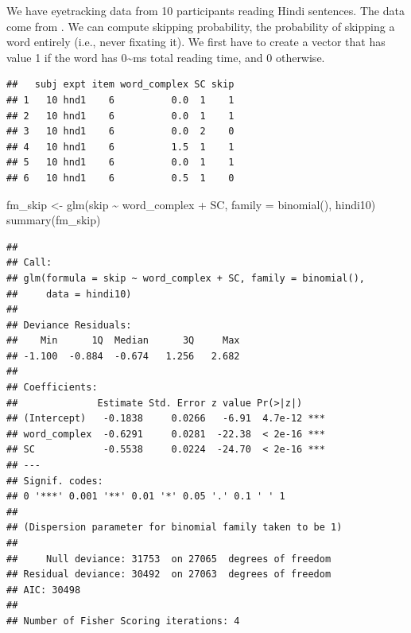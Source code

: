\documentclass[
  12pt,
]{krantz}
\newenvironment{Shaded}{\begin{snugshade}}{\end{snugshade}}
\newcommand{\AttributeTok}[1]{\textcolor[rgb]{0.77,0.63,0.00}{#1}}
\newcommand{\DecValTok}[1]{\textcolor[rgb]{0.00,0.00,0.81}{#1}}
\newcommand{\DocumentationTok}[1]{\textcolor[rgb]{0.56,0.35,0.01}{\textbf{\textit{#1}}}}
\newcommand{\FunctionTok}[1]{\textcolor[rgb]{0.00,0.00,0.00}{#1}}
\newcommand{\NormalTok}[1]{#1}
\newcommand{\OtherTok}[1]{\textcolor[rgb]{0.56,0.35,0.01}{#1}}
\newcommand{\SpecialCharTok}[1]{\textcolor[rgb]{0.00,0.00,0.00}{#1}}
\newcommand{\StringTok}[1]{\textcolor[rgb]{0.31,0.60,0.02}{#1}}
\theoremstyle{definition}
\theoremstyle{definition}
\theoremstyle{definition}
\theoremstyle{definition}
\theoremstyle{remark}
\begin{document}
We have eyetracking data from 10 participants reading Hindi sentences. The data come from \citet{HusainVasishthNarayanan2015}. We can compute skipping probability, the probability of skipping a word entirely (i.e., never fixating it). We first have to create a vector that has value 1 if the word has 0\textasciitilde ms total reading time, and 0 otherwise.

\begin{Shaded}
\end{Shaded}

\begin{verbatim}
##   subj expt item word_complex SC skip
## 1   10 hnd1    6          0.0  1    1
## 2   10 hnd1    6          0.0  1    1
## 3   10 hnd1    6          0.0  2    0
## 4   10 hnd1    6          1.5  1    1
## 5   10 hnd1    6          0.0  1    1
## 6   10 hnd1    6          0.5  1    0
\end{verbatim}

\begin{Shaded}
\begin{Highlighting}[]
\NormalTok{fm\_skip }\OtherTok{\textless{}{-}} \FunctionTok{glm}\NormalTok{(skip }\SpecialCharTok{\textasciitilde{}}\NormalTok{ word\_complex }\SpecialCharTok{+}\NormalTok{ SC, }\AttributeTok{family =} \FunctionTok{binomial}\NormalTok{(), hindi10)}
\FunctionTok{summary}\NormalTok{(fm\_skip)}
\end{Highlighting}
\end{Shaded}

\begin{verbatim}
## 
## Call:
## glm(formula = skip ~ word_complex + SC, family = binomial(), 
##     data = hindi10)
## 
## Deviance Residuals: 
##    Min      1Q  Median      3Q     Max  
## -1.100  -0.884  -0.674   1.256   2.682  
## 
## Coefficients:
##              Estimate Std. Error z value Pr(>|z|)    
## (Intercept)   -0.1838     0.0266   -6.91  4.7e-12 ***
## word_complex  -0.6291     0.0281  -22.38  < 2e-16 ***
## SC            -0.5538     0.0224  -24.70  < 2e-16 ***
## ---
## Signif. codes:  
## 0 '***' 0.001 '**' 0.01 '*' 0.05 '.' 0.1 ' ' 1
## 
## (Dispersion parameter for binomial family taken to be 1)
## 
##     Null deviance: 31753  on 27065  degrees of freedom
## Residual deviance: 30492  on 27063  degrees of freedom
## AIC: 30498
## 
## Number of Fisher Scoring iterations: 4
\end{verbatim}
\end{document}
